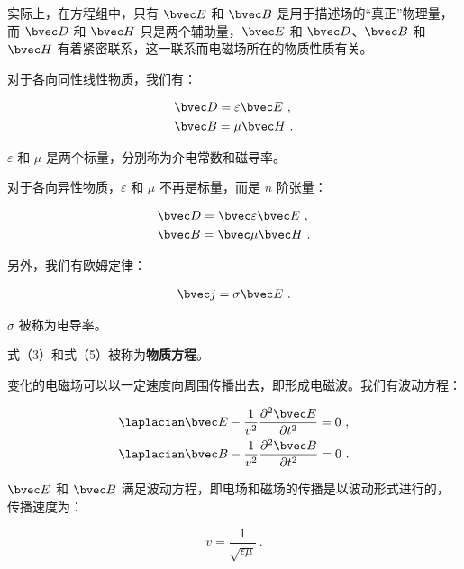 实际上，在方程组中，只有 $\bvec E$ 和 $\bvec B$ 是用于描述场的“真正”物理量，而 $\bvec D$ 和 $\bvec H$ 只是两个辅助量，$\bvec E$ 和 $\bvec D$、$\bvec B$ 和 $\bvec H$ 有着紧密联系，这一联系而电磁场所在的物质性质有关。

对于各向同性线性物质，我们有：

\begin{equation}
\begin{aligned}
& \bvec D = \varepsilon \bvec E ~, \\
& \bvec B = \mu \bvec H ~.
\end{aligned}
\end{equation}

$\varepsilon$ 和 $\mu$ 是两个标量，分别称为介电常数和磁导率。

对于各向异性物质，$\varepsilon$ 和 $\mu$ 不再是标量，而是 $n$ 阶张量：

\begin{equation}
\begin{aligned}
& \bvec D = \bvec \varepsilon \bvec E ~, \\
& \bvec B = \bvec \mu \bvec H ~.
\end{aligned}
\end{equation}

另外，我们有欧姆定律：

\begin{equation}
\begin{aligned}
\bvec j = \sigma \bvec E ~.
\end{aligned}
\end{equation}

$\sigma$ 被称为电导率。

式（3）和式（5）被称为\textbf{物质方程}。

变化的电磁场可以以一定速度向周围传播出去，即形成电磁波。我们有波动方程：

\begin{equation}
\begin{aligned}
& \laplacian \bvec E - \frac{1}{v^2} \frac{\partial ^ 2 \bvec E}{\partial t^2} = 0 ~, \\
& \laplacian \bvec B - \frac{1}{v^2} \frac{\partial ^ 2 \bvec B}{\partial t^2} = 0 ~.
\end{aligned}
\end{equation}

$\bvec E$ 和 $\bvec B$ 满足波动方程，即电场和磁场的传播是以波动形式进行的，传播速度为：

\begin{equation}
v = \frac{1}{\sqrt{\epsilon\mu}} ~.
\end{equation}

